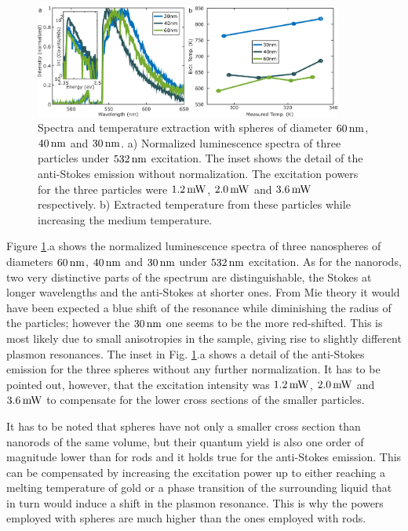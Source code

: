\begin{figure}[htp] \centering
\includegraphics[width=0.90\textwidth]{Chapters/04_Anti-Stokes/Figures/07_Spheres/07_spheres.png}
\caption{Spectra and temperature extraction with spheres of
diameter $60\,\textrm{nm}$,$40\,\textrm{nm}$ and $30\,\textrm{nm}$. a) Normalized luminescence spectra of
three particles under $532\,\textrm{nm}$ excitation. The inset shows the detail of the
anti-Stokes emission without normalization. The excitation powers for the three
particles were $1.2\,\textrm{mW}$, $2.0\,\textrm{mW}$ and $3.6\,\textrm{mW}$ respectively. b) Extracted
temperature from these particles while increasing the medium temperature.}
	\label{fig:spheres}
\end{figure}

Figure \ref{fig:spheres}.a shows the normalized luminescence spectra of three
nanospheres of diameters $60\,\textrm{nm}$, $40\,\textrm{nm}$ and $30\,\textrm{nm}$ under $532\,\textrm{nm}$ excitation.
As for the nanorods, two very distinctive parts of the spectrum are
distinguishable, the Stokes at longer wavelengths and the anti-Stokes at shorter
ones. From Mie theory it would have been expected a blue shift of the resonance
while diminishing the radius of the particles; however the $30\,\textrm{nm}$ one seems to
be the more red-shifted. This is most likely due to small anisotropies in the
sample, giving rise to slightly different plasmon resonances. The inset in Fig.
\ref{fig:spheres}.a shows a detail of the anti-Stokes emission for the three
spheres without any further normalization. It has to be pointed out, however,
that the excitation intensity was $1.2\,\textrm{mW}$, $2.0\,\textrm{mW}$ and $3.6\,\textrm{mW}$ to compensate
for the lower cross sections of the smaller particles.

It has to be noted that spheres have not only a smaller cross section than
nanorods of the same volume, but their quantum yield is also one order of
magnitude lower than for rods and it holds true for the anti-Stokes emission.
This can be compensated by increasing the excitation power up to either reaching
a melting temperature of gold or a phase transition of the surrounding liquid
that in turn would induce a shift in the plasmon resonance. This is why the
powers employed with spheres are much higher than the ones employed with rods.

